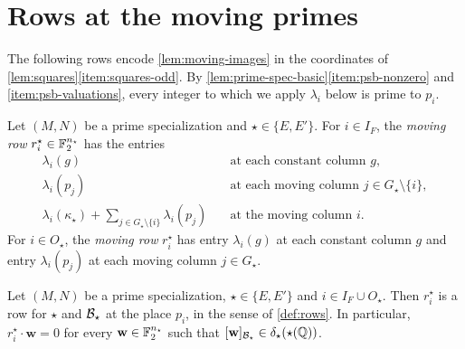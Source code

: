 \section{Rows at the moving primes}\label{sec:families-rows}

The following rows encode \cref{lem:moving-images} in the coordinates of \cref{lem:squares}\ref{item:squares-odd}. By \cref{lem:prime-spec-basic}\ref{item:psb-nonzero} and \ref{item:psb-valuations}, every integer to which we apply $\lambda_i$ below is prime to $p_i$.

\begin{definition}\label{def:moving-rows}
Let $(M,N)$ be a prime specialization and $\star\in\{E,E'\}$. For $i\in I_F$, the \emph{moving row} $r^\star_i\in\mathbb F_2^{n_\star}$ has the entries
\begin{equation}\label{eq:moving-row-F}
\begin{array}{ll}
\lambda_i(g) & \text{at each constant column }g,\\
\lambda_i(p_j) & \text{at each moving column }j\in G_\star\setminus\{i\},\\
\lambda_i(\kappa_\star)+\sum_{j\in G_\star\setminus\{i\}}\lambda_i(p_j)\quad & \text{at the moving column }i.
\end{array}
\end{equation}
For $i\in O_\star$, the \emph{moving row} $r^\star_i$ has entry $\lambda_i(g)$ at each constant column $g$ and entry $\lambda_i(p_j)$ at each moving column $j\in G_\star$.
\end{definition}

\begin{lemma}\label{lem:moving-rows}
Let $(M,N)$ be a prime specialization, $\star\in\{E,E'\}$ and $i\in I_F\cup O_\star$. Then $r^\star_i$ is a row for $\star$ and $\mathcal B_\star$ at the place $p_i$, in the sense of \cref{def:rows}. In particular, $r^\star_i\cdot\mathbf w=0$ for every $\mathbf w\in\mathbb F_2^{n_\star}$ such that $[\mathbf w]_{\mathcal B_\star}\in\delta_\star(\star(\mathbb Q))$.
\end{lemma}

